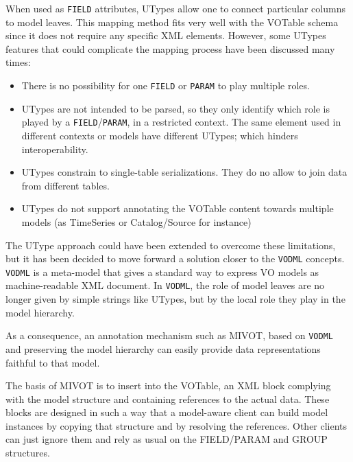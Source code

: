 When used as \texttt{FIELD} attributes, UTypes allow one to connect particular columns to model leaves. This mapping method fits very well with the VOTable schema since it does not require any specific XML elements. 
However, some UTypes features that could complicate the mapping process have been discussed many times:

\begin{itemize}
  \item There is no possibility for one  \texttt{FIELD} or \texttt{PARAM} to play multiple roles.
  \item UTypes are not intended to be parsed, so they only identify which role is played by a \texttt{FIELD}/\texttt{PARAM}, 
  in a restricted context. The same element used in different contexts or models have different UTypes; which hinders interoperability.
  \item UTypes constrain to single-table serializations. They do no allow to join data from different tables. 
  \item UTypes do not support annotating the VOTable content towards multiple models 
  (as TimeSeries or Catalog/Source for instance)
\end{itemize}

The UType approach could have been extended to overcome these limitations, but it has been decided to move forward a solution closer to the \texttt{VODML} \citep{2018ivoa.spec.0910L} concepts. 
\texttt{VODML} is a meta-model that gives a standard way to express VO models as machine-readable XML document.
In \texttt{VODML}, the role of model leaves are no longer given by simple strings like UTypes, but by the local role they play in the model hierarchy.




As a consequence, an annotation mechanism such as MIVOT, based on \texttt{VODML} and preserving the model hierarchy can easily provide data representations faithful to that model.

The basis of MIVOT is to insert into the VOTable, an XML block complying with the 
model structure and containing references to the actual data.
These blocks are designed in such a way that a model-aware client can build  model instances by copying that structure and by resolving the references. 
Other clients can just ignore them and rely as usual on the FIELD/PARAM and GROUP structures.


